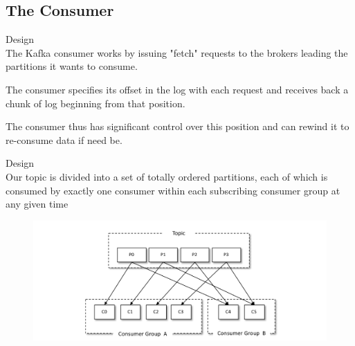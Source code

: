 \subsection{The Consumer}
\begin{frame}[plain,t]{Design} %
     \\
    \vspace{2ex}
    The Kafka consumer works by issuing "fetch" requests to the brokers leading the partitions it wants to consume. 
    
    \vspace{2ex}
    The consumer specifies its offset in the log with each request and receives back a chunk of log beginning from that position. 
    
    \vspace{2ex}
    The consumer thus has significant control over this position and can rewind it to re-consume data if need be.
    
    
    
\end{frame}
\begin{frame}[plain,t]{Design} %
     \\
    \vspace{2ex}
    Our topic is divided into a set of totally ordered partitions, each of which is consumed by exactly one consumer within each subscribing consumer group at any given time
    
    \begin{figure}
        \centering
        \includegraphics[width=0.9\linewidth]{image/0205}
        \label{fig:0205}
    \end{figure}
    
    
    
\end{frame}
